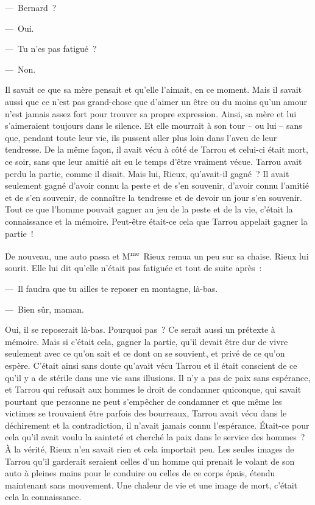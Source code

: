 \documentclass[french,twoside]{book} %
\begin{document}
— Bernard ?\par
— Oui.\par
— Tu n’es pas fatigué ?\par
— Non.\par
Il savait ce que sa mère pensait et qu’elle l’aimait, en ce moment. Mais il savait aussi que ce n’est pas grand-chose que d’aimer un être ou du moins qu’un amour n’est jamais assez fort pour trouver sa propre expression. Ainsi, sa mère et lui s’aimeraient toujours dans le silence. Et elle mourrait à son tour – ou lui – sans que, pendant toute leur vie, ils pussent aller plus loin dans l’aveu de leur tendresse. De la même façon, il avait vécu à côté de Tarrou et celui-ci était mort, ce soir, sans que leur amitié ait eu le temps d’être vraiment vécue. Tarrou avait perdu la partie, comme il disait. Mais lui, Rieux, qu’avait-il gagné ? Il avait seulement gagné d’avoir connu la peste et de s’en souvenir, d’avoir connu l’amitié et de s’en souvenir, de connaître la tendresse et de devoir un jour s’en souvenir. Tout ce que l’homme pouvait gagner au jeu de la peste et de la vie, c’était la connaissance et la mémoire. Peut-être était-ce cela que Tarrou appelait gagner la partie !\par
De nouveau, une auto passa et M\textsuperscript{me} Rieux remua un peu sur sa chaise. Rieux lui sourit. Elle lui dit qu’elle n’était pas fatiguée et tout de suite après :\par
— Il faudra que tu ailles te reposer en montagne, là-bas.\par
— Bien sûr, maman.\par
Oui, il se reposerait là-bas. Pourquoi pas ? Ce serait aussi un prétexte à mémoire. Mais si c’était cela, gagner la partie, qu’il devait être dur de vivre seulement avec ce qu’on sait et ce dont on se souvient, et privé de ce qu’on espère. C’était ainsi sans doute qu’avait vécu Tarrou et il était conscient de ce qu’il y a de stérile dans une vie sans illusions. Il n’y a pas de paix sans espérance, et Tarrou qui refusait aux hommes le droit de condamner quiconque, qui savait pourtant que personne ne peut s’empêcher de condamner et que même les victimes se trouvaient être parfois des bourreaux, Tarrou avait vécu dans le déchirement et la contradiction, il n’avait jamais connu l’espérance. Était-ce pour cela qu’il avait voulu la sainteté et cherché la paix dans le service des hommes ? À la vérité, Rieux n’en savait rien et cela importait peu. Les seules images de Tarrou qu’il garderait seraient celles d’un homme qui prenait le volant de son auto à pleines mains pour le conduire ou celles de ce corps épais, étendu maintenant sans mouvement. Une chaleur de vie et une image de mort, c’était cela la connaissance.\par
\end{document}
